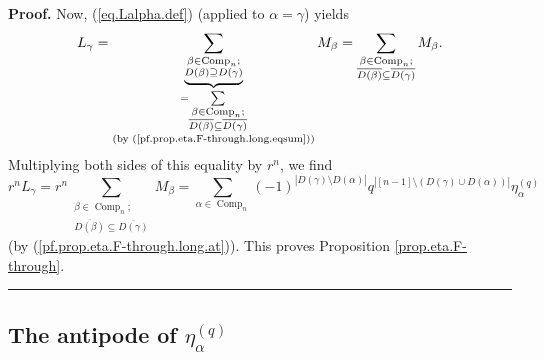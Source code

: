 \documentclass[numbers=enddot,12pt,final,onecolumn,notitlepage]{scrartcl}%
\theoremstyle{definition}
\newenvironment{proof}[1][Proof]{\noindent\textbf{#1.} }{\ \rule{0.5em}{0.5em}}
\let\sumnonlimits\sum
\renewcommand{\sum}{\sumnonlimits\limits}
\newenvironment{verlong}{}{}
\begin{document}
\begin{verlong}
\begin{proof}
Now, (\ref{eq.Lalpha.def}) (applied to $\alpha=\gamma$) yields%
\[
L_{\gamma}=\underbrace{\sum_{\substack{\beta\in\operatorname*{Comp}%
\nolimits_{n};\\D\left(  \beta\right)  \supseteq D\left(  \gamma\right)  }%
}}_{\substack{=\sum_{\substack{\beta\in\operatorname*{Comp}\nolimits_{n}%
;\\\overline{D\left(  \beta\right)  }\subseteq\overline{D\left(
\gamma\right)  }}}\\\text{(by (\ref{pf.prop.eta.F-through.long.eqsum}))}%
}}M_{\beta}=\sum_{\substack{\beta\in\operatorname*{Comp}\nolimits_{n}%
;\\\overline{D\left(  \beta\right)  }\subseteq\overline{D\left(
\gamma\right)  }}}M_{\beta}.
\]
Multiplying both sides of this equality by $r^{n}$, we find%
\[
r^{n}L_{\gamma}=r^{n}\sum_{\substack{\beta\in\operatorname*{Comp}%
\nolimits_{n};\\\overline{D\left(  \beta\right)  }\subseteq\overline{D\left(
\gamma\right)  }}}M_{\beta}=\sum_{\alpha\in\operatorname*{Comp}\nolimits_{n}%
}\left(  -1\right)  ^{\left\vert D\left(  \gamma\right)  \setminus D\left(
\alpha\right)  \right\vert }q^{\left\vert \left[  n-1\right]  \setminus\left(
D\left(  \gamma\right)  \cup D\left(  \alpha\right)  \right)  \right\vert
}\eta_{\alpha}^{\left(  q\right)  }%
\]
(by (\ref{pf.prop.eta.F-through.long.at})). This proves Proposition
\ref{prop.eta.F-through}.
\end{proof}
\end{verlong}

\subsection{The antipode of $\eta_{\alpha}^{\left(  q\right)  }$}
\end{document}
